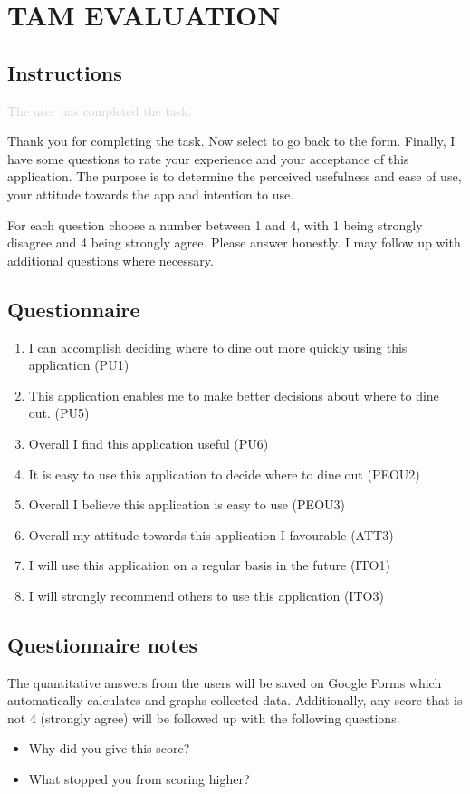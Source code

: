 \documentclass[a4 paper, 10pt]{article}
\begin{document}
\section*{TAM EVALUATION}
    \subsection*{Instructions}
        \textcolor{lightgray}{The user has completed the task.}

        \begin{itshape}
            Thank you for completing the task. Now select to go back to the form. Finally, I have some questions to rate your experience and your  acceptance of this application. The purpose is to determine the perceived usefulness and ease of use, your attitude towards the app and intention to use.

            For each question choose a number between 1 and 4, with 1 being strongly disagree and 4 being strongly agree. Please answer honestly. I may follow up with additional questions where necessary. 
        \end{itshape}

    \subsection*{Questionnaire}
        \begin{enumerate}
            \item I can accomplish deciding where to dine out more quickly using this application (PU1)
            \item This application enables me to make better decisions about where to dine out. (PU5)
            \item Overall I find this application useful (PU6)
            \item It is easy to use this application to decide where to dine out (PEOU2)
            \item Overall I believe this application is easy to use (PEOU3)
            \item Overall my attitude towards this application I favourable (ATT3)
            \item I will use this application on a regular basis in the future (ITO1)
            \item I will strongly recommend others to use this application (ITO3)
        \end{enumerate}

    \subsection*{Questionnaire notes}
        The quantitative answers from the users will be saved on Google Forms which automatically calculates and graphs collected data. Additionally, any score that is not 4 (strongly agree) will be followed up with the following questions.
        \begin{itemize}
            \item Why did you give this score?
            \item What stopped you from scoring higher?
        \end{itemize}
\end{document}

